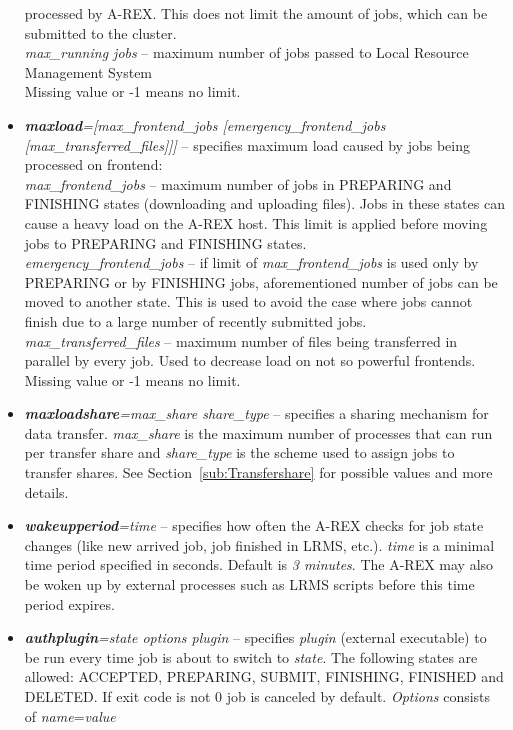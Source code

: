 \documentclass{article}                            %
\begin{document}
\begin{itemize}
processed by A-REX. This does not limit the amount of jobs, which can
be submitted to the cluster.\\
\textit{max\_running jobs} -- maximum number of jobs passed to Local
Resource Management System\\
Missing value or -1 means no limit.
\item \textbf{\textit{maxload}}\textit{={[}max\_frontend\_jobs {[}emergency\_frontend\_jobs
{[}max\_transferred\_files]]]} -- specifies maximum load caused by
jobs being processed on frontend:\\
\textit{max\_frontend\_jobs} -- maximum number of jobs in PREPARING and
FINISHING states (downloading and uploading files). Jobs in these
states can cause a heavy load on the A-REX host. This limit is applied
before moving jobs to PREPARING and FINISHING states.\\
\textit{emergency\_frontend\_jobs} -- if limit of \textit{max\_frontend\_jobs}
is used only by PREPARING or by FINISHING jobs, aforementioned number
of jobs can be moved to another state. This is used to avoid the case
where jobs cannot finish due to a large number of recently submitted jobs.\\
\textit{max\_transferred\_files} -- maximum number of files being transferred
in parallel by every job. Used to decrease load on not so powerful
frontends.\\
Missing value or -1 means no limit.
\item \textbf{\textit{maxloadshare}}\textit{=max\_share share\_type} -- specifies a 
sharing mechanism for data transfer. \emph{max\_share} is the maximum
number of processes that can run per transfer share and \emph{share\_type} is 
the scheme used to assign jobs to transfer shares. See Section~\ref{sub:Transfershare}
for possible values and more details.
\item \textbf{\textit{wakeupperiod}}\textit{=time} -- specifies how often
the A-REX checks for job state changes (like new arrived job, job
finished in LRMS, etc.). \textit{time} is a minimal time period specified
in seconds. Default is \emph{3 minutes}. The A-REX may also be woken up by
external processes such as LRMS scripts before this time period expires.
\item \textbf{\textit{authplugin}}\textit{=state options plugin} -- specifies
\emph{plugin} (external executable) to be run every time job is about
to switch to \emph{state}. The following states are allowed: ACCEPTED,
PREPARING, SUBMIT, FINISHING, FINISHED and DELETED. If exit code is
not 0 job is canceled by default. \textit{Options} consists of \textit{name}=\textit{value}

\end{itemize}
\end{document}
